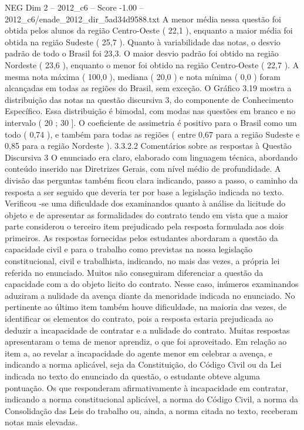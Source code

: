 \begin{textsample}{NEG Dim 2 – 2012\_c6 – Score -1.00 – 2012\_c6/enade\_2012\_dir\_5ad34d9588.txt}
A menor média nessa questão foi obtida pelos alunos da região Centro-Oeste ( 22,1 ), enquanto a maior média foi obtida na região Sudeste ( 25,7 ).
Quanto à variabilidade das notas, o desvio padrão de todo o Brasil foi 23,3.
O maior desvio padrão foi obtido na região Nordeste ( 23,6 ), enquanto o menor foi obtido na região Centro-Oeste ( 22,7 ).
A mesma nota máxima ( 100,0 ), mediana ( 20,0 ) e nota mínima ( 0,0 ) foram alcançadas em todas as regiões do Brasil, sem exceção.
O Gráfico 3.19 mostra a distribuição das notas na questão discursiva 3, do componente de Conhecimento Específico.
Essa distribuição é bimodal, com modas nas questões em branco e no intervalo ( 20 ; 30 ].
O coeficiente de assimetria é positivo para o Brasil como um todo ( 0,74 ), e também para todas as regiões ( entre 0,67 para a região Sudeste e 0,85 para a região Nordeste ). 3.3.2.2 Comentários sobre as respostas à Questão Discursiva 3 O enunciado era claro, elaborado com linguagem técnica, abordando conteúdo inserido nas Diretrizes Gerais, com nível médio de profundidade.
A divisão das perguntas também ficou clara indicando, passo a passo, o caminho da resposta a ser seguido que deveria ter por base a legislação indicada no texto.
Verificou -se uma dificuldade dos examinandos quanto à análise da licitude do objeto e de apresentar as formalidades do contrato tendo em vista que a maior parte considerou o terceiro item prejudicado pela resposta formulada aos dois primeiros.
As respostas fornecidas pelos estudantes abordaram a questão da capacidade civil e para o trabalho como previstas na nossa legislação constitucional, civil e trabalhista, indicando, no mais das vezes, a própria lei referida no enunciado.
Muitos não conseguiram diferenciar a questão da capacidade com a do objeto licito do contrato.
Nesse caso, inúmeros examinandos aduziram a nulidade da avença diante da menoridade indicada no enunciado.
No pertinente ao último item também houve dificuldade, na maioria das vezes, de identificar os elementos do contrato, pois a resposta estaria prejudicada ao deduzir a incapacidade de contratar e a nulidade do contrato.
Muitas respostas apresentaram o tema de menor aprendiz, o que foi aproveitado.
Em relação ao item a, ao revelar a incapacidade do agente menor em celebrar a avença, e indicando a norma aplicável, seja da Constituição, do Código Civil ou da Lei indicada no texto do enunciado da questão, o estudante obteve alguma pontuação.
Os que responderam afirmativamente à incapacidade em contratar, indicando a norma constitucional aplicável, a norma do Código Civil, a norma da Consolidação das Leis do trabalho ou, ainda, a norma citada no texto, receberam notas mais elevadas.

\end{textsample}
